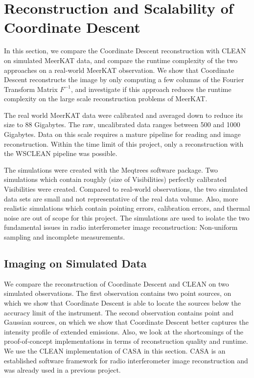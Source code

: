 \section{Reconstruction and Scalability of Coordinate Descent}
In this section, we compare the Coordinate Descent reconstruction with CLEAN on simulated MeerKAT data, and compare the runtime complexity of the two approaches on a real-world MeerKAT observation. We show that Coordinate Descent reconstructs the image by only computing a few columns of the Fourier Transform Matrix $F^{-1}$, and investigate if this approach reduces the runtime complexity on the large scale reconstruction problems of MeerKAT.

The real world MeerKAT data were calibrated and averaged down to reduce its size to 88 Gigabytes. The raw, uncalibrated data ranges between 500 and 1000 Gigabytes. Data on this scale requires a mature pipeline for reading and image reconstruction. Within the time limit of this project, only a reconstruction with the WSCLEAN\cite{offringa2014wsclean} pipeline was possible.

The simulations were created with the Meqtrees software package. Two simulations which contain roughly (size of Visibilities) perfectly calibrated Visibilities were created. Compared to real-world observations, the two simulated data sets are small and not representative of the real data volume. Also, more realistic simulations which contain pointing errors, calibration errors, and thermal noise are out of scope for this project. The simulations are used to isolate the two fundamental issues in radio interferometer image reconstruction: Non-uniform sampling and incomplete measurements.

\subsection{Imaging on Simulated Data}
We compare the reconstruction of Coordinate Descent and CLEAN on two simulated observations. The first observation contains two point sources, on which we show that Coordinate Descent is able to locate the sources below the accuracy limit of the instrument. The second observation contains point and Gaussian sources, on which we show that Coordinate Descent better captures the intensity profile of extended emissions. Also, we look at the shortcomings of the proof-of-concept implementations in terms of reconstruction quality and runtime. We use the CLEAN implementation of CASA in this section. CASA is an established software framework for radio interferometer image reconstruction and was already used in a previous project.

